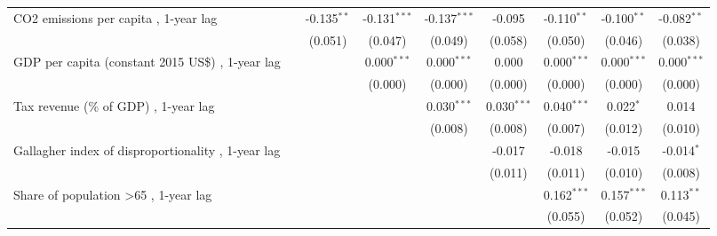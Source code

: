 \begin{table}[htbp]
\begin{tabular}{lcccccccc}
      CO2 emissions per capita , 1-year lag                                                                    &               & -0.135$^{**}$  & -0.131$^{***}$ & -0.137$^{***}$ & -0.095        & -0.110$^{**}$ & -0.100$^{**}$ & -0.082$^{**}$\\   
                                                                                                               &               & (0.051)        & (0.047)        & (0.049)        & (0.058)       & (0.050)       & (0.046)       & (0.038)\\   
      GDP per capita (constant 2015 US\$) , 1-year lag                                                         &               &                & 0.000$^{***}$  & 0.000$^{***}$  & 0.000         & 0.000$^{***}$ & 0.000$^{***}$ & 0.000$^{***}$\\   
                                                                                                               &               &                & (0.000)        & (0.000)        & (0.000)       & (0.000)       & (0.000)       & (0.000)\\   
      Tax revenue (\% of GDP) , 1-year lag                                                                     &               &                &                & 0.030$^{***}$  & 0.030$^{***}$ & 0.040$^{***}$ & 0.022$^{*}$   & 0.014\\   
                                                                                                               &               &                &                & (0.008)        & (0.008)       & (0.007)       & (0.012)       & (0.010)\\   
      Gallagher index of disproportionality , 1-year lag                                                       &               &                &                &                & -0.017        & -0.018        & -0.015        & -0.014$^{*}$\\   
                                                                                                               &               &                &                &                & (0.011)       & (0.011)       & (0.010)       & (0.008)\\   
      Share of population >65 , 1-year lag                                                                     &               &                &                &                &               & 0.162$^{***}$ & 0.157$^{***}$ & 0.113$^{**}$\\   
                                                                                                               &               &                &                &                &               & (0.055)       & (0.052)       & (0.045)\\   

\end{tabular}
\end{table}
